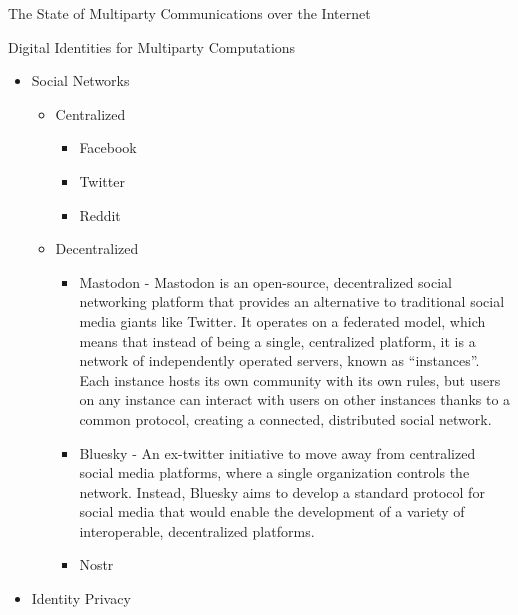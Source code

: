\begin{frame}[fragile]{The State of Multiparty Communications over the
Internet}
\begin{block}{Digital Identities for Multiparty Computations}
\begin{itemize}
  \begin{itemize}
  \tightlist
  \item
    Decentralized Identifiers
  \item
    Verifiable Credentials
  \item
    Identity Overlay Network (ION) from Microsoft

    \begin{itemize}
    \tightlist
    \item
      DPKI
    \end{itemize}
  \end{itemize}
\item
  Social Networks

  \begin{itemize}
  \tightlist
  \item
    Centralized

    \begin{itemize}
    \tightlist
    \item
      Facebook
    \item
      Twitter
    \item
      Reddit
    \end{itemize}
  \item
    Decentralized

    \begin{itemize}
    \tightlist
    \item
      Mastodon - Mastodon is an open-source, decentralized social
      networking platform that provides an alternative to traditional
      social media giants like Twitter. It operates on a federated
      model, which means that instead of being a single, centralized
      platform, it is a network of independently operated servers, known
      as ``instances''. Each instance hosts its own community with its
      own rules, but users on any instance can interact with users on
      other instances thanks to a common protocol, creating a connected,
      distributed social network.
    \item
      Bluesky - An ex-twitter initiative to move away from centralized
      social media platforms, where a single organization controls the
      network. Instead, Bluesky aims to develop a standard protocol for
      social media that would enable the development of a variety of
      interoperable, decentralized platforms.
    \item
      Nostr
    \end{itemize}
  \end{itemize}
\item
  Identity Privacy
\end{itemize}
\end{block}
\end{frame}


